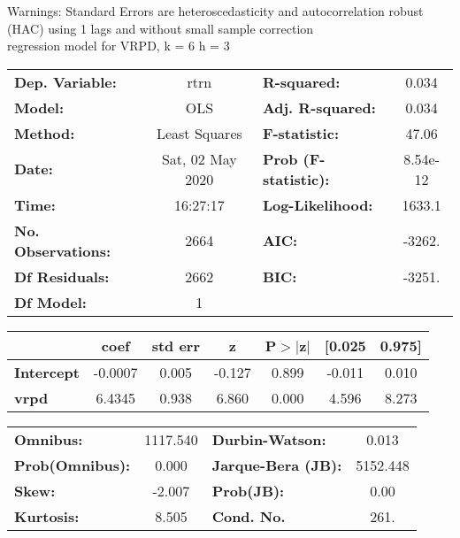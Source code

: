 Warnings: \newline
 [1] Standard Errors are heteroscedasticity and autocorrelation robust (HAC) using 1 lags and without small sample correction\\ 

regression model for VRPD, k = 6 h = 3\begin{center}
\begin{tabular}{lclc}
\toprule
\textbf{Dep. Variable:}    &       rtrn       & \textbf{  R-squared:         } &     0.034   \\
\textbf{Model:}            &       OLS        & \textbf{  Adj. R-squared:    } &     0.034   \\
\textbf{Method:}           &  Least Squares   & \textbf{  F-statistic:       } &     47.06   \\
\textbf{Date:}             & Sat, 02 May 2020 & \textbf{  Prob (F-statistic):} &  8.54e-12   \\
\textbf{Time:}             &     16:27:17     & \textbf{  Log-Likelihood:    } &    1633.1   \\
\textbf{No. Observations:} &        2664      & \textbf{  AIC:               } &    -3262.   \\
\textbf{Df Residuals:}     &        2662      & \textbf{  BIC:               } &    -3251.   \\
\textbf{Df Model:}         &           1      & \textbf{                     } &             \\
\bottomrule
\end{tabular}
\begin{tabular}{lcccccc}
                   & \textbf{coef} & \textbf{std err} & \textbf{z} & \textbf{P$> |$z$|$} & \textbf{[0.025} & \textbf{0.975]}  \\
\midrule
\textbf{Intercept} &      -0.0007  &        0.005     &    -0.127  &         0.899        &       -0.011    &        0.010     \\
\textbf{vrpd}      &       6.4345  &        0.938     &     6.860  &         0.000        &        4.596    &        8.273     \\
\bottomrule
\end{tabular}
\begin{tabular}{lclc}
\textbf{Omnibus:}       & 1117.540 & \textbf{  Durbin-Watson:     } &    0.013  \\
\textbf{Prob(Omnibus):} &   0.000  & \textbf{  Jarque-Bera (JB):  } & 5152.448  \\
\textbf{Skew:}          &  -2.007  & \textbf{  Prob(JB):          } &     0.00  \\
\textbf{Kurtosis:}      &   8.505  & \textbf{  Cond. No.          } &     261.  \\
\bottomrule
\end{tabular}
\end{center}

